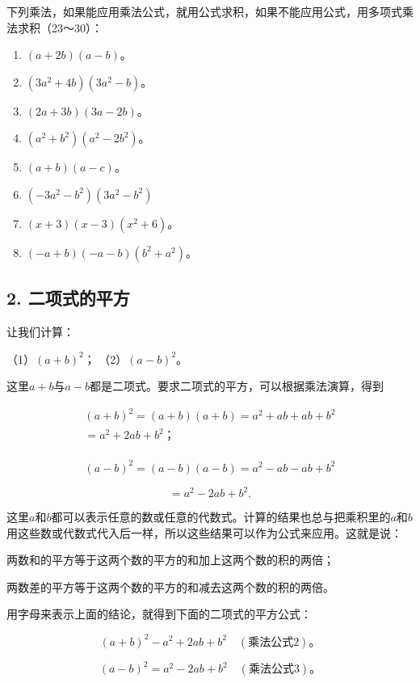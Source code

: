 下列乘法，如果能应用乘法公式，就用公式求积，如果不能应用公式，用多项式乘法求积（23～30）：

\begin{enumerate}[start=23]
\item
  \((a + 2b)(a - b)\)。
\item
  \((3a^{2} + 4b)(3a^{2} - b)\)。
\item
  \((2a + 3b)(3a - 2b)\)。
\item
  \((a^2 + b^2)(a^2 - 2b^2)\)。
\item
  \((a + b)(a - c)\)。
\item
  \((-3a^{2} - b^{2})(3a^{2} - b^{2})\)
\item
  \((x + 3)(x - 3)(x^2 +6)\)。
\item
  \((-a + b)(-a - b)(b^2 + a^2)\)。
\end{enumerate}

\subsection{2. 二项式的平方}

让我们计算：

（1）\((a + b)^2\)； （2）\((a - b)^2\)。

这里\(a + b\)与\(a - b\)都是二项式。要求二项式的平方，可以根据乘法演算，得到

\[
\begin{array}{l} (a + b) ^{2} = (a + b) (a + b) = a ^{2} + a b + a b + b ^{2} \\ = a ^{2} + 2 a b + b ^{2}\text{；} \\ \end{array}
\]

\[
(a - b) ^{2} = (a - b) (a - b) = a ^{2} - a b - a b + b ^{2}
\]

\[
= a ^{2} - 2 a b + b ^{2}.
\]

这里\(a\)和\(b\)都可以表示任意的数或任意的代数式。计算的结果也总与把乘积里的\(a\)和\(b\)用这些数或代数式代入后一样，所以这些结果可以作为公式来应用。这就是说：

两数和的平方等于这两个数的平方的和加上这两个数的积的两倍；

两数差的平方等于这两个数的平方的和减去这两个数的积的两倍。

用字母来表示上面的结论，就得到下面的二项式的平方公式：

\[
(a + b) ^{2} - a ^{2} + 2 a b + b ^{2} \quad (\text{乘法公式} 2)\text{。}
\]

\[
(a - b) ^{2} = a ^{2} - 2 a b + b ^{2} \quad (\text{乘法公式} 3)\text{。}
\]

